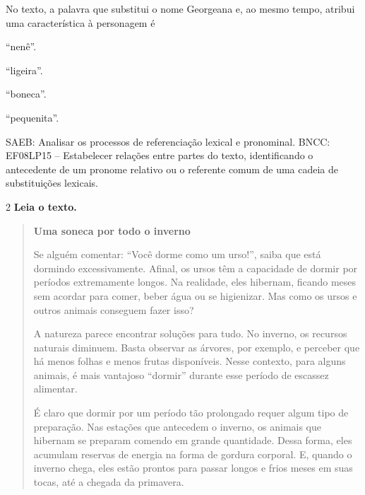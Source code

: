 
No texto, a palavra que substitui o nome Georgeana e, ao mesmo tempo,
atribui uma característica à personagem é

\begin{escolha}
\item ``nenê''.

\item ``ligeira''.

\item ``boneca''.

\item ``pequenita''.
\end{escolha}

SAEB: Analisar os processos de referenciação lexical e pronominal. BNCC:
EF08LP15 -- Estabelecer relações entre partes do texto, identificando o
antecedente de um pronome relativo ou o referente comum de uma cadeia de
substituições lexicais.

\num{2} \textbf{Leia o texto.}

\begin{quote}
\textbf{Uma soneca por todo o inverno}

Se alguém comentar: ``Você dorme como um urso!'', saiba que está
dormindo excessivamente. Afinal, os ursos têm a capacidade de dormir por
períodos extremamente longos. Na realidade, eles hibernam, ficando meses
sem acordar para comer, beber água ou se higienizar. Mas como os ursos e
outros animais conseguem fazer isso?

A natureza parece encontrar soluções para tudo. No inverno, os recursos
naturais diminuem. Basta observar as árvores, por exemplo, e perceber
que há menos folhas e menos frutas disponíveis. Nesse contexto, para
alguns animais, é mais vantajoso ``dormir'' durante esse período de
escassez alimentar.

É claro que dormir por um período tão prolongado requer algum tipo de
preparação. Nas estações que antecedem o inverno, os animais que
hibernam se preparam comendo em grande quantidade. Dessa forma, eles
acumulam reservas de energia na forma de gordura corporal. E, quando o
inverno chega, eles estão prontos para passar longos e frios meses em
suas tocas, até a chegada da primavera.
\end{quote}


